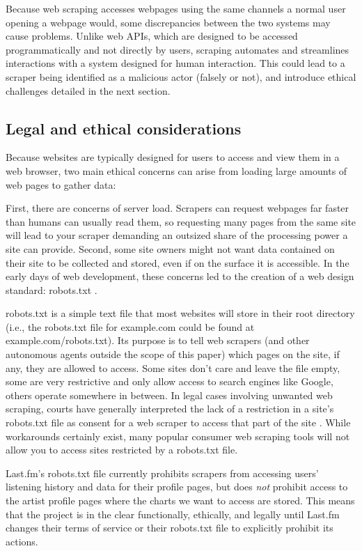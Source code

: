 Because web scraping accesses webpages using the same channels a normal user opening a webpage would, some discrepancies between the two systems may cause problems. Unlike web APIs, which are designed to be accessed programmatically and not directly by users, scraping automates and streamlines interactions with a system designed for human interaction. This could lead to a scraper being identified as a malicious actor (falsely or not), and introduce ethical challenges detailed in the next section.

\subsection{Legal and ethical considerations}

Because websites are typically designed for users to access and view them in a web browser, two main ethical concerns can arise from loading large amounts of web pages to gather data:

First, there are concerns of server load. Scrapers can request webpages far faster than humans can usually read them, so requesting many pages from the same site will lead to your scraper demanding an outsized share of the processing power a site can provide. Second, some site owners might not want data contained on their site to be collected and stored, even if on the surface it is accessible. In the early days of web development, these concerns led to the creation of a web design standard: robots.txt \cite{mitchell_web_2015}.

robots.txt is a simple text file that most websites will store in their root directory (i.e., the robots.txt file for example.com could be found at example.com/robots.txt). Its purpose is to tell web scrapers (and other autonomous agents outside the scope of this paper) which pages on the site, if any, they are allowed to access. Some sites don't care and leave the file empty, some are very restrictive and only allow access to search engines like Google, others operate somewhere in between. In legal cases involving unwanted web scraping, courts have generally interpreted the lack of a restriction in a site's robots.txt file as consent for a web scraper to access that part of the site \cite{mitchell_web_2015}. While workarounds certainly exist, many popular consumer web scraping tools will not allow you to access sites restricted by a robots.txt file.

Last.fm's robots.txt file currently prohibits scrapers from accessing users' listening history and data for their profile pages, but does \textit{not} prohibit access to the artist profile pages where the charts we want to access are stored. This means that the project is in the clear functionally, ethically, and legally until Last.fm changes their terms of service or their robots.txt file to explicitly prohibit its actions.